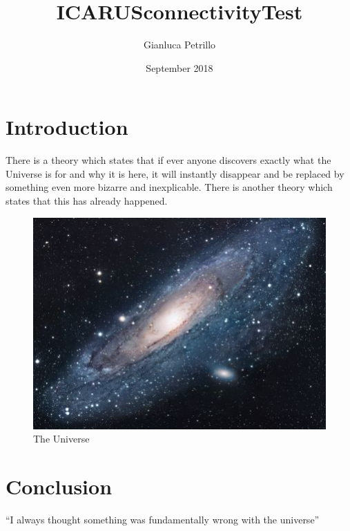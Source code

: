 \documentclass{article}
\title{ICARUSconnectivityTest}
\author{Gianluca Petrillo}
\date{September 2018}
\begin{document}
\maketitle

\section{Introduction}
There is a theory which states that if ever anyone discovers exactly what the Universe is for and why it is here, it will instantly disappear and be replaced by something even more bizarre and inexplicable.
There is another theory which states that this has already happened.

\begin{figure}[h!]
\centering
\includegraphics[scale=1.7]{universe}
\caption{The Universe}
\label{fig:universe}
\end{figure}

\section{Conclusion}
``I always thought something was fundamentally wrong with the universe'' \citep{adams1995hitchhiker}



\end{document}
